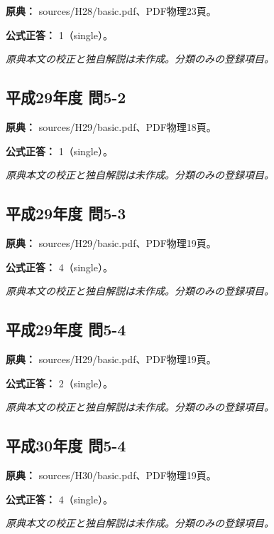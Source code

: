 \noindent\textbf{原典：} sources/H28/basic.pdf、PDF物理23頁。

\textbf{公式正答：} 1（single）。

\par\textit{原典本文の校正と独自解説は未作成。分類のみの登録項目。}

\subsection{平成29年度 問5-2}
\label{q:h29-reg-basic-5-2}

\noindent\textbf{原典：} sources/H29/basic.pdf、PDF物理18頁。

\textbf{公式正答：} 1（single）。

\par\textit{原典本文の校正と独自解説は未作成。分類のみの登録項目。}

\subsection{平成29年度 問5-3}
\label{q:h29-reg-basic-5-3}

\noindent\textbf{原典：} sources/H29/basic.pdf、PDF物理19頁。

\textbf{公式正答：} 4（single）。

\par\textit{原典本文の校正と独自解説は未作成。分類のみの登録項目。}

\subsection{平成29年度 問5-4}
\label{q:h29-reg-basic-5-4}

\noindent\textbf{原典：} sources/H29/basic.pdf、PDF物理19頁。

\textbf{公式正答：} 2（single）。

\par\textit{原典本文の校正と独自解説は未作成。分類のみの登録項目。}

\subsection{平成30年度 問5-4}
\label{q:h30-reg-basic-5-4}

\noindent\textbf{原典：} sources/H30/basic.pdf、PDF物理19頁。

\textbf{公式正答：} 4（single）。

\par\textit{原典本文の校正と独自解説は未作成。分類のみの登録項目。}

